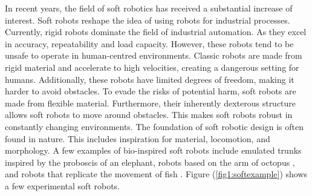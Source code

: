 \label{chap1}

In recent years, the field of soft robotics has received a substantial increase of interest. Soft robots reshape the idea of using robots for industrial processes. Currently, rigid robots dominate the field of industrial automation. As they excel in accuracy, repeatability and load capacity. However, these robots tend to be unsafe to operate in human-centred environments. Classic robots are made from rigid material and accelerate to high velocities, creating a dangerous setting for humans. Additionally, these robots have limited degrees of freedom, making it harder to avoid obstacles. To evade the risks of potential harm, soft robots are made from flexible material. Furthermore, their inherently dexterous structure allows soft robots to move around obstacles. This makes soft robots robust in constantly changing environments. The foundation of soft robotic design is often found in nature. This includes inspiration for material, locomotion, and morphology. A few examples of bio-inspired soft robots include emulated trunks \cite{hannan2003kinematics} inspired by the proboscis of an elephant, robots based on the arm of octopus \cite{wang2013visual}, and robots that replicate the movement of fish \cite{marchese2014}. Figure (\ref{fig1:softexample}) shows a few experimental soft robots. 


